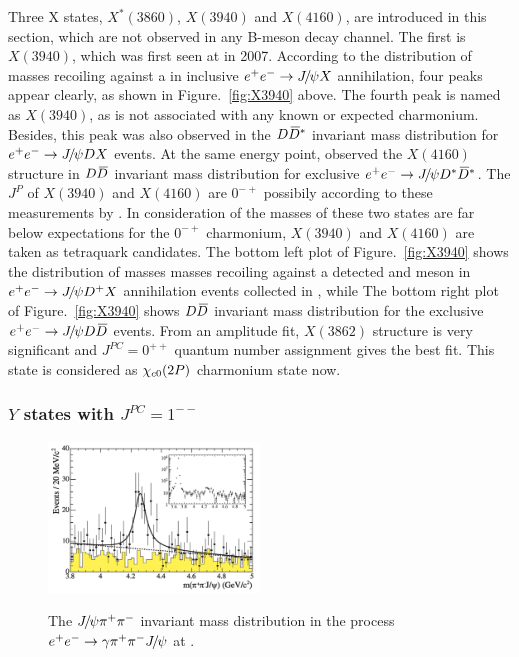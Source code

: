 Three X states, $X^{*}(3860)$, $X(3940)$ and $X(4160)$, are introduced in this section,
which are not observed in any B-meson decay channel. 
The first is $X(3940)$,
which was first seen at \belle in 2007\supercite{PhysRevLett.98.082001}.
According to the distribution of masses recoiling against a \jpsi in inclusive ${e^+}{e^-}\rightarrow{\ensuremath{{J\mskip -3mu/\mskip -2mu\psi}}} X$ annihilation,
four peaks appear clearly, 
as shown in Figure.~\ref{fig:X3940} above.
The fourth peak is named as $X(3940)$, 
as is not associated with any known or expected charmonium. 
Besides,
this peak was also observed in the ${D}{{\kern 0.18em\overline{\kern -0.18em D}}{}^*}$ invariant mass distribution for ${e^+}{e^-}\rightarrow{\ensuremath{{J\mskip -3mu/\mskip -2mu\psi}}} DX$ events\supercite{PhysRevLett.100.202001}.
At the same energy point,
\belle observed the $X(4160)$ structure in ${D}{\kern 0.18em\overline{\kern -0.18em D}}$ invariant mass distribution for exclusive ${e^+}{e^-}\rightarrow{\ensuremath{{J\mskip -3mu/\mskip -2mu\psi}}}{\ensuremath{{D}^*}}{\ensuremath{{\kern 0.18em\overline{\kern -0.18em D}}{}^*}}$\supercite{PhysRevLett.100.202001}.
The $J^{P}$ of $X(3940)$ and $X(4160)$ are $0^{-+}$ possibily according to these measurements by \belle.
In consideration of the masses of these two states are far below expectations for the $0^{-+}$ charmonium,
$X(3940)$ and $X(4160)$ are taken as tetraquark candidates.
The bottom left plot of Figure.~\ref{fig:X3940} shows the distribution of masses masses recoiling against a detected \jpsi and \D meson in ${e^+}{e^-}\rightarrow{\ensuremath{{J\mskip -3mu/\mskip -2mu\psi}}}{\ensuremath{{D}^+}} X$ annihilation events collected in \belle\supercite{PhysRevD.95.112003},
while The bottom right plot of Figure.~\ref{fig:X3940} shows ${D}{\kern 0.18em\overline{\kern -0.18em D}}$ invariant mass distribution for the exclusive ${e^+}{e^-}\rightarrow{\ensuremath{{J\mskip -3mu/\mskip -2mu\psi}}}{\ensuremath{D}}{\ensuremath{\kern 0.18em\overline{\kern -0.18em D}}}$ events.
From an amplitude fit, 
$X(3862)$ structure is very significant and $J^{PC}=0^{++}$ quantum number assignment gives the best fit.
This state is considered as ${\chi_{{c} 0}}(2P)$ charmonium state now.





\subsubsection{$Y$ states with $J^{PC}=1^{--}$}
\label{subsub:Y4260}

\begin{figure}[!hbtp]
\centering
   \includegraphics[width=0.5\textwidth]{Figures/01_Introduction/Exotic/neutral_particle/X4260} \\%
   \caption{ The ${{J\mskip -3mu/\mskip -2mu\psi}}{{\pi}^+}{{\pi}^-}$ invariant mass distribution in the process ${e^+}{e^-}\rightarrow{\ensuremath{\gamma}}{\ensuremath{{\pi}^+}}{\ensuremath{{\pi}^-}}{\ensuremath{{J\mskip -3mu/\mskip -2mu\psi}}}$ at \babar\supercite{PhysRevD.71.052001}.}
\label{fig:Y4260}
\end{figure}

